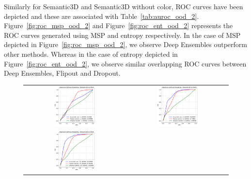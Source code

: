     Similarly for Semantic3D and Semantic3D without color, ROC curves have been depicted and these are associated with Table~\ref{tab:auroc_ood_2}.
    Figure~\ref{fig:roc_msp_ood_2} and Figure~\ref{fig:roc_ent_ood_2} represents the ROC curves generated using MSP and entropy respectively.
    In the case of MSP depicted in Figure~\ref{fig:roc_msp_ood_2}, we observe Deep Ensembles outperform other methods.
    Whereas in the case of entropy depicted in Figure~\ref{fig:roc_ent_ood_2}, we observe similar overlapping ROC curves between Deep Ensembles, Flipout and Dropout.
    \begin{figure}
        \centering
        \begin{tabular}{cc}
            \includegraphics[width = 0.42\textwidth, height= 0.3\textheight]{images/AUROC/MSP_1.pdf} & 
            \includegraphics[width = 0.42\textwidth, height= 0.3\textheight]{images/AUROC/MSP_5.pdf}\\ 
            \includegraphics[width = 0.42\textwidth, height= 0.3\textheight]{images/AUROC/MSP_10.pdf} &

\end{tabular}
\end{figure}
